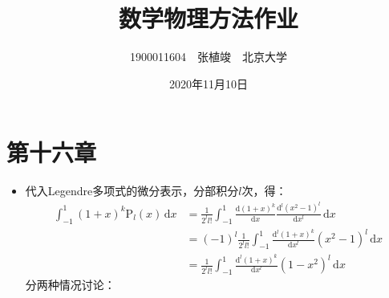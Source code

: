 \documentclass[fontset=windows]{ctexart}
\begin{document}
    \title{\textbf{数学物理方法作业}}
    \author{1900011604\ \ 张植竣\ \ 北京大学}
    \date{2020年11月10日}

    \maketitle

    \section*{第十六章}

    \bigskip
    \begin{itemize}

    \item[2.]
    代入Legendre多项式的微分表示，分部积分$l$次，得：
    \begin{align*}
            \int_{-1}^{1}(1+x)^k\mathrm{P}_l(x)\,\mathrm{d}x
            &= \frac{1}{2^l l!}\int_{-1}^{1}\frac{\mathrm{d}(1+x)^k}{\mathrm{d}x}\frac{\mathrm{d}^l(x^2-1)^l}{\mathrm{d}x^l}\,\mathrm{d}x \\
            &= (-1)^l\frac{1}{2^l l!}\int_{-1}^{1}\frac{\mathrm{d}^l(1+x)^k}{\mathrm{d}x^l}(x^2-1)^{l}\,\mathrm{d}x \\
            &= \frac{1}{2^l l!}\int_{-1}^{1}\frac{\mathrm{d}^l(1+x)^k}{\mathrm{d}x^l}(1-x^2)^{l}\,\mathrm{d}x
    \end{align*}
    分两种情况讨论：


\end{itemize}
\end{document}
